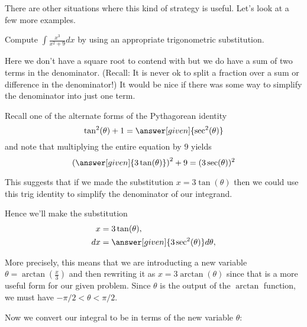 \documentclass{ximera}
\begin{document}
There are other situations where this kind of strategy is useful. Let's look at a few more examples.

\begin{example}
  Compute $\int \frac{x^3}{x^2+9} dx$ by using an appropriate trigonometric substitution.
  
  \begin{explanation}
Here we don't have a square root to contend with but we do have a sum of two 
terms in the denominator. (Recall: It is never ok to split a fraction over a sum or difference in the denominator!)   It would be nice if there was some way to simplify the denominator into just one term. 

   Recall one of the alternate forms of the Pythagorean identity
    \[
    \tan^2(\theta) + 1 = \answer[given]{\sec^2(\theta)}
    \]
    and note that multiplying the entire equation by $9$ yields
    \[
    \left(\answer[given]{3\tan(\theta)}\right)^2 + 9 = (3\sec(\theta))^2
    \]

This suggests that if we made the substitution $x=3\tan(\theta)$ then we could
use this trig identity to simplify the denominator of our integrand. 

    Hence we'll make the substitution
    \begin{align*}
      x &= 3\tan(\theta),\\
      dx &= \answer[given]{3\sec^2(\theta)} d\theta,
    \end{align*}

\begin{remark}
More precisely, this means that we are introducting a new variable $\theta=\arctan\left(\frac{x}{3}\right)$ 
and then rewriting it as $x=3\arctan(\theta)$ since that is a more useful form 
for our given problem. Since $\theta$ is the output of the $\arctan$ function, we must have
$-\pi/2 < \theta < \pi/2$. 
\end{remark}

Now we convert our integral to be in terms of the new variable $\theta$:


\end{explanation}
\end{example}
\end{document}
